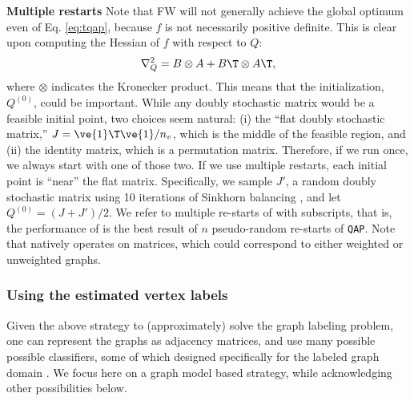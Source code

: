 \documentclass[10pt,journal,cspaper,compsoc]{IEEEtran}
\begin{document}

\textbf{Multiple restarts} Note that FW will not generally achieve the global optimum even of Eq. \eqref{eq:tqap}, because $f$ is not necessarily positive definite.  This is clear upon computing the Hessian of $f$  with respect to $Q$:
\begin{align}
	\nabla_Q^2  =  B \otimes A + B\T \otimes A\T,
\end{align}
where $\otimes$ indicates the Kronecker product. This means that the initialization, $Q^{(0)}$, could be important.  While any doubly stochastic matrix would be a feasible initial point, two choices seem natural: (i) the ``flat doubly  stochastic matrix,'' $J=\ve{1}\T \ve{1}/n_v$, which is the middle of the feasible region, and (ii) the identity matrix, which is a permutation matrix.  Therefore, if we run \qap  once, we always start with one of those two.  If we use multiple restarts, each initial point is ``near'' the flat matrix.  Specifically, we sample $J'$, a random doubly stochastic matrix using 10 iterations of Sinkhorn balancing \cite{Sinkhorn1964}, and let $Q^{(0)}=(J+J')/2$.  We refer to multiple re-starts of \qap with subscripts, that is, the performance of \qapn is the best result of $n$ pseudo-random re-starts of \texttt{QAP}.  Note that \qap natively operates on matrices, which could correspond to either weighted or unweighted graphs.



\subsubsection{Using the estimated vertex labels} %
\label{sec:algorithms}

Given the above strategy to (approximately) solve the graph labeling problem, one can represent the graphs as adjacency matrices, and use many possible possible classifiers, some of which designed specifically for the labeled graph domain \cite{Vogelstein2011}. We focus here on a graph model based strategy, while acknowledging other possibilities below.  


\end{document}
